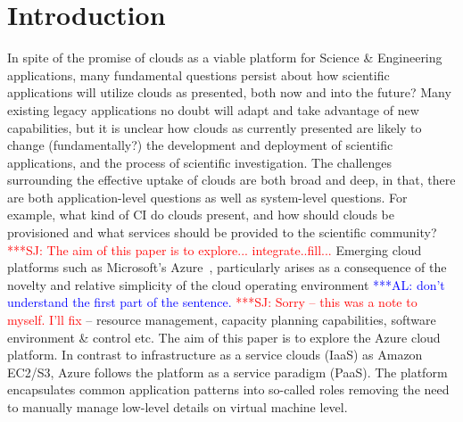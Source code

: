 \documentclass[conference,final]{IEEEtran}
\newcommand{\up}{\vspace*{-1em}}
\newcommand{\alnote}[1]{ {\textcolor{blue} { ***AL: #1 }}}
\newcommand{\jhanote}[1]{ {\textcolor{red} { ***SJ: #1 }}}
\newcommand{\alnote}[1]{}
\newcommand{\jhanote}[1]{}
\begin{document}
\section{Introduction}
\up
In spite of the promise of clouds as a viable platform for Science \&
Engineering applications, many fundamental questions persist about how
scientific applications will utilize clouds as presented, both now and
into the future? Many existing legacy applications no doubt will adapt
and take advantage of new capabilities, but it is unclear how clouds
as currently presented are likely to change (fundamentally?)  the
development and deployment of scientific applications, and the process
of scientific investigation. The challenges surrounding the effective
uptake of clouds are both broad and deep, in that, there are both
application-level questions as well as system-level questions. For
example, what kind of CI do clouds present, and how should clouds be
provisioned and what services should be provided to the scientific
community? \jhanote{The aim of this paper is to
  explore... integrate..fill...} Emerging cloud platforms such as
Microsoft's Azure~\cite{winazure}, particularly arises as a
consequence of the novelty and relative simplicity of the cloud
operating environment \alnote{don't understand the first part of the
  sentence.} \jhanote{Sorry -- this was a note to myself. I'll fix}–
resource management, capacity planning capabilities, software
environment \& control etc. The aim of this paper is to explore the
Azure cloud platform. In contrast to infrastructure as a service
clouds (IaaS) as Amazon EC2/S3, Azure follows the platform as a
service paradigm (PaaS).  The platform encapsulates common application
patterns into so-called roles removing the need to manually manage
low-level details on virtual machine
level.  %

 


\end{document}
